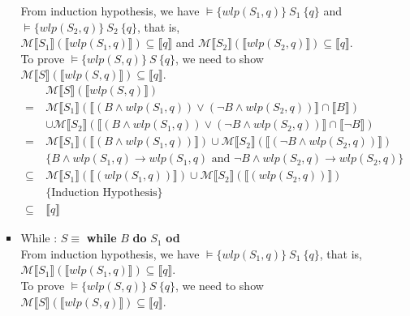 \documentclass[11pt]{article}
\begin{document}
\begin{enumerate}
\begin{enumerate}
\begin{itemize}
					From induction hypothesis, we have $\models \{wlp(S_{1}, q)\}~S_{1}~\{q\}$ and $\models \{wlp(S_{2}, q)\}~S_{2}~\{q\}$, that is,\\ $\mathcal{M}\llbracket S_{1} \rrbracket (\llbracket wlp(S_{1}, q) \rrbracket) \subseteq \llbracket q \rrbracket$ and $\mathcal{M}\llbracket S_{2} \rrbracket (\llbracket wlp(S_{2}, q) \rrbracket) \subseteq \llbracket q \rrbracket$.\\ To prove $\models \{wlp(S,q)\}~S~\{q\}$, we need to show $\mathcal{M}\llbracket S\rrbracket(\llbracket wlp(S, q)\rrbracket) \subseteq \llbracket q \rrbracket$.
					\begin{align*}
						&\mathcal{M}\llbracket S\rrbracket(\llbracket wlp(S, q)\rrbracket)\\
						=~ & \mathcal{M}\llbracket S_{1}\rrbracket(\llbracket (B \land wlp(S_{1}, q)) \lor (\neg B \land wlp(S_{2}, q))\rrbracket \cap \llbracket B \rrbracket)\\
						& \cup \mathcal{M}\llbracket S_{2}\rrbracket(\llbracket (B \land wlp(S_{1}, q)) \lor (\neg B \land wlp(S_{2}, q))\rrbracket \cap \llbracket \neg B \rrbracket)\\
						=~ & \mathcal{M}\llbracket S_{1}\rrbracket(\llbracket (B \land wlp(S_{1}, q)) \rrbracket) \cup \mathcal{M}\llbracket S_{2}\rrbracket(\llbracket (\neg B \land wlp(S_{2}, q)) \rrbracket)\\
						&\{B \land wlp(S_{1}, q) \to wlp(S_{1}, q) \text{ and } \neg B \land wlp(S_{2}, q) \to wlp(S_{2}, q)\}\\
						\subseteq~ & \mathcal{M}\llbracket S_{1}\rrbracket(\llbracket (wlp(S_{1}, q)) \rrbracket) \cup \mathcal{M}\llbracket S_{2}\rrbracket(\llbracket (wlp(S_{2}, q)) \rrbracket)\\
						&\{\text{Induction Hypothesis}\}\\
						\subseteq~ & \llbracket q \rrbracket
					\end{align*}
				\item While : $S\equiv$ \textbf{while} $B$ \textbf{do} $S_{1}$ \textbf{od}\\
					From induction hypothesis, we have $\models \{wlp(S_{1}, q)\}~S_{1}~\{q\}$, that is, $\mathcal{M}\llbracket S_{1} \rrbracket (\llbracket wlp(S_{1}, q) \rrbracket) \subseteq \llbracket q \rrbracket$.\\ To prove $\models \{wlp(S,q)\}~S~\{q\}$, we need to show $\mathcal{M}\llbracket S\rrbracket(\llbracket wlp(S, q)\rrbracket) \subseteq \llbracket q \rrbracket$.
					\begin{align*}

\end{align*}
\end{itemize}
\end{enumerate}
\end{enumerate}
\end{document}
